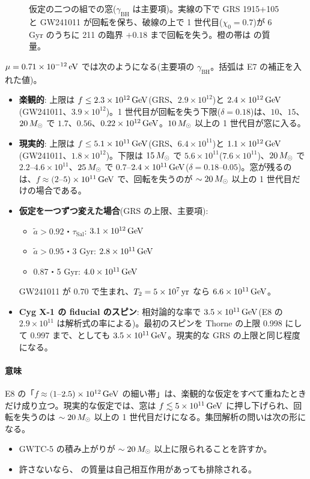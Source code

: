 \begin{figure}[H]
\centering

\caption{仮定の二つの組での窓($\gamma_\mathrm{BH}$ は主要項)。実線の下で GRS 1915+105 と GW241011 が回転を保ち、破線の上で 1 世代目($\chi_0=0.7$)が 6 Gyr のうちに 211 の臨界 $+0.18$ まで回転を失う。橙の帯は  の質量。}
\label{fig:e09}
\end{figure}

\begin{result}
$\mu=0.71\times10^{-12}\,\mathrm{eV}$ では次のようになる(主要項の $\gamma_\mathrm{BH}$。括弧は E7 の補正を入れた値)。
\begin{itemize}
\item \textbf{楽観的}: 上限は $f\le2.3\times10^{12}\,\mathrm{GeV}$(GRS、$2.9\times10^{12}$)と $2.4\times10^{12}\,\mathrm{GeV}$(GW241011、$3.9\times10^{12}$)。1 世代目が回転を失う下限($\delta=0.18$)は、$10$、$15$、$20\,M_\odot$ で $1.7$、$0.56$、$0.22\times10^{12}\,\mathrm{GeV}$。$10\,M_\odot$ 以上の 1 世代目が窓に入る。
\item \textbf{現実的}: 上限は $f\le5.1\times10^{11}\,\mathrm{GeV}$(GRS、$6.4\times10^{11}$)と $1.1\times10^{12}\,\mathrm{GeV}$(GW241011、$1.8\times10^{12}$)。下限は $15\,M_\odot$ で $5.6\times10^{11}$($7.6\times10^{11}$)、$20\,M_\odot$ で $2.2$--$4.6\times10^{11}$、$25\,M_\odot$ で $0.7$--$2.4\times10^{11}\,\mathrm{GeV}$($\delta=0.18$--$0.05$)。窓が残るのは、$f\approx(2$--$5)\times10^{11}\,\mathrm{GeV}$ で、回転を失うのが $\sim20\,M_\odot$ 以上の 1 世代目だけの場合である。
\item \textbf{仮定を一つずつ変えた場合}(GRS の上限、主要項):
  \begin{itemize}
  \item $\tilde a>0.92$・$\tau_\mathrm{Sal}$: $3.1\times10^{12}\,\mathrm{GeV}$
  \item $\tilde a>0.95$・3 Gyr: $2.8\times10^{11}\,\mathrm{GeV}$
  \item 0.87・5 Gyr: $4.0\times10^{11}\,\mathrm{GeV}$
  \end{itemize}
  GW241011 が 0.70 で生まれ、$T_2=5\times10^7\,\mathrm{yr}$ なら $6.6\times10^{11}\,\mathrm{GeV}$。
\item \textbf{Cyg X-1 の fiducial のスピン}: 相対論的な率で $3.5\times10^{11}\,\mathrm{GeV}$(E8 の $2.9\times10^{11}$ は解析式の率による)。最初のスピンを Thorne の上限 0.998 にして 0.997 まで、としても $3.5\times10^{11}\,\mathrm{GeV}$。現実的な GRS の上限と同じ程度になる。
\end{itemize}
\end{result}

\paragraph{意味}
E8 の「$f\approx(1$--$2.5)\times10^{12}\,\mathrm{GeV}$ の細い帯」は、楽観的な仮定をすべて重ねたときだけ成り立つ。現実的な仮定では、窓は $f\lesssim5\times10^{11}\,\mathrm{GeV}$ に押し下げられ、回転を失うのは $\sim20\,M_\odot$ 以上の 1 世代目だけになる。集団解析の問いは次の形になる。
\begin{itemize}
\item GWTC-5 の積み上がりが $\sim20\,M_\odot$ 以上に限られることを許すか。
\item 許さないなら、 の質量は自己相互作用があっても排除される。
\end{itemize}


